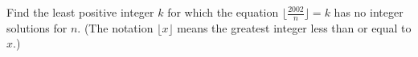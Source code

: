 Find the least positive integer $k$ for which the equation $\lfloor \frac{2002}{n}\rfloor = k$ has no integer solutions for $n.$ (The notation $\lfloor x \rfloor$ means the greatest integer less than or equal to $x.$)